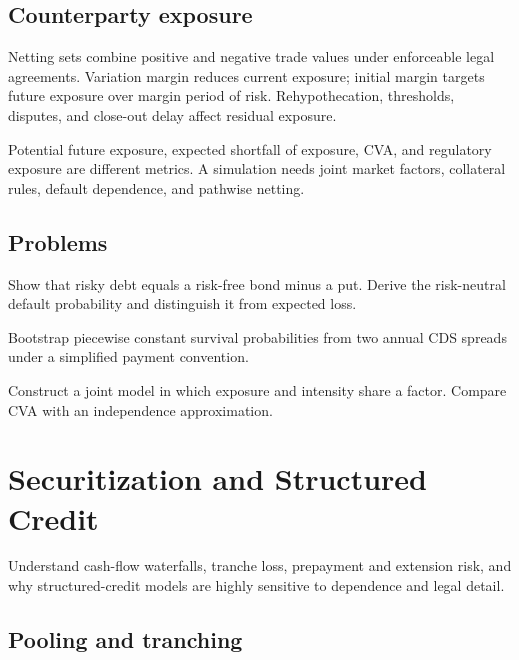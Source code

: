 \section{Counterparty exposure}

Netting sets combine positive and negative trade values under enforceable legal
agreements. Variation margin reduces current exposure; initial margin targets future
exposure over margin period of risk. Rehypothecation, thresholds, disputes, and close-out
delay affect residual exposure.

Potential future exposure, expected shortfall of exposure, CVA, and regulatory
exposure are different metrics. A simulation needs joint market factors, collateral
rules, default dependence, and pathwise netting.

\section{Problems}

\begin{exercise}
Show that risky debt equals a risk-free bond minus a put. Derive the risk-neutral
default probability and distinguish it from expected loss.
\end{exercise}
\begin{exercise}
Bootstrap piecewise constant survival probabilities from two annual CDS spreads
under a simplified payment convention.
\end{exercise}
\begin{exercise}
Construct a joint model in which exposure and intensity share a factor. Compare CVA
with an independence approximation.
\end{exercise}


\chapter{Securitization and Structured Credit}

\begin{objectives}
Understand cash-flow waterfalls, tranche loss, prepayment and extension risk, and
why structured-credit models are highly sensitive to dependence and legal detail.
\end{objectives}

\section{Pooling and tranching}

